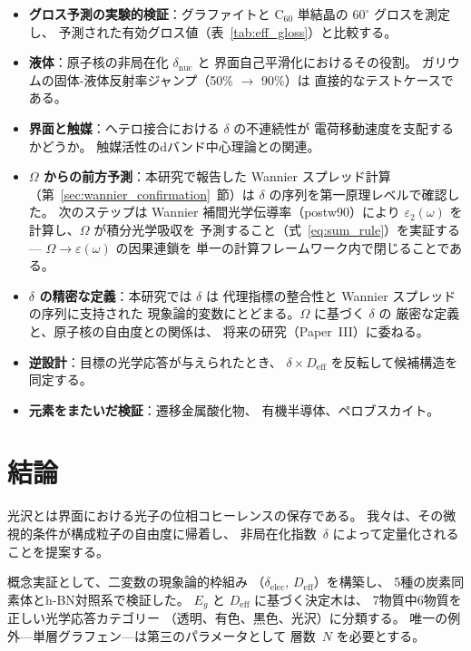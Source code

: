 \documentclass[twocolumn,showpacs,preprintnumbers,amsmath,amssymb,prb]{revtex4-2}
\begin{document}
\begin{itemize}
  \item \textbf{グロス予測の実験的検証}：グラファイトと
    C$_{60}$ 単結晶の $60^\circ$ グロスを測定し、
    予測された有効グロス値（表~\ref{tab:eff_gloss}）と比較する。
  \item \textbf{液体}：原子核の非局在化 $\delta_\mathrm{nuc}$ と
    界面自己平滑化におけるその役割。
    ガリウムの固体-液体反射率ジャンプ（50\% $\to$ 90\%）は
    直接的なテストケースである。
  \item \textbf{界面と触媒}：ヘテロ接合における $\delta$ の不連続性が
    電荷移動速度を支配するかどうか。
    触媒活性のdバンド中心理論との関連。
  \item \textbf{$\Omega$ からの前方予測}：本研究で報告した
    Wannier スプレッド計算（第~\ref{sec:wannier_confirmation}~節）は
    $\delta$ の序列を第一原理レベルで確認した。
    次のステップは Wannier 補間光学伝導率（postw90）により
    $\varepsilon_2(\omega)$ を計算し、$\Omega$ が積分光学吸収を
    予測すること（式~\ref{eq:sum_rule}）を実証する---
    $\Omega \to \varepsilon(\omega)$ の因果連鎖を
    単一の計算フレームワーク内で閉じることである。
  \item \textbf{$\delta$ の精密な定義}：本研究では $\delta$ は
    代理指標の整合性と Wannier スプレッドの序列に支持された
    現象論的変数にとどまる。$\Omega$ に基づく $\delta$ の
    厳密な定義と、原子核の自由度との関係は、
    将来の研究（Paper~III）に委ねる。
  \item \textbf{逆設計}：目標の光学応答が与えられたとき、
    $\delta \times D_\mathrm{eff}$ を反転して候補構造を
    同定する。
  \item \textbf{元素をまたいだ検証}：遷移金属酸化物、
    有機半導体、ペロブスカイト。
\end{itemize}

\section{結論}
\label{sec:conclusion}

光沢とは界面における光子の位相コヒーレンスの保存である。
我々は、その微視的条件が構成粒子の自由度に帰着し、
非局在化指数~$\delta$ によって定量化されることを提案する。

概念実証として、二変数の現象論的枠組み
（$\delta_\mathrm{elec}$, $D_\mathrm{eff}$）を構築し、
5種の炭素同素体とh-BN対照系で検証した。
$E_g$ と $D_\mathrm{eff}$ に基づく決定木は、
7物質中6物質を正しい光学応答カテゴリー
（透明、有色、黒色、光沢）に分類する。
唯一の例外---単層グラフェン---は第三のパラメータとして
層数~$N$ を必要とする。
\end{document}
